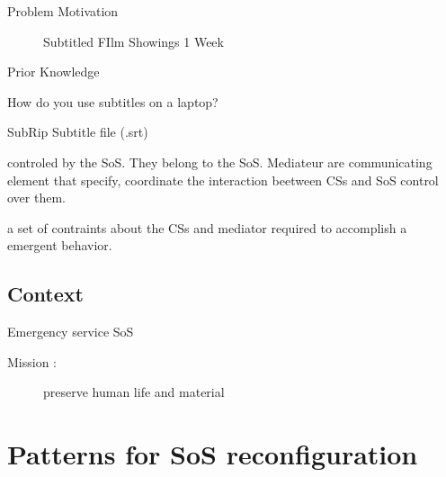 \documentclass[notes]{beamer}
\begin{document}
\begin{frame}{Problem Motivation}
\begin{figure}
\begin{minipage}{0.45\textwidth}
		\caption{Subtitled FIlm Showings 1 Week}
	\end{minipage}
\end{figure}
\end{frame}



\begin{frame}{Prior Knowledge}
\begin{description}
  \item How do you use subtitles on a laptop?
  \item SubRip Subtitle file (.srt)
  \item[Mediator :] controled by the SoS. They belong to the
    SoS. Mediateur are communicating element that specify, coordinate
    the interaction beetween CSs and SoS control over them.
  \item[Coalition :] a set of contraints about the CSs and
    mediator required to accomplish a emergent behavior.
\end{description}
\end{frame}


\subsection{Context}
\begin{frame}{Emergency service SoS}
\begin{description}
  \item[Mission :] preserve human life and material
\end{description}

\end{frame}

\section{Patterns for SoS reconfiguration}
\end{document}

